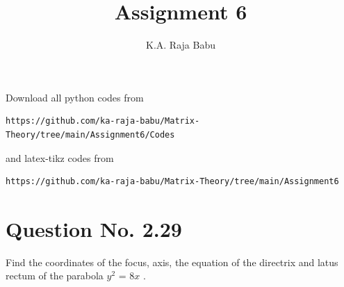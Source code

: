 \documentclass[journal,12pt,twocolumn]{IEEEtran}
\begin{document}
     \def\rightbox#1{\makebox[0in][r]{#1}}
     \def\centbox#1{\makebox[0in]{#1}}
     \def\topbox#1{\raisebox{-\baselineskip}[0in][0in]{#1}}
     \def\midbox#1{\raisebox{-0.5\baselineskip}[0in][0in]{#1}}
\vspace{3cm}
\title{Assignment 6}
\author{K.A. Raja Babu}
\maketitle
\newpage
\bigskip
\renewcommand{\thefigure}{\theenumi}
\renewcommand{\thetable}{\theenumi}
Download all python codes from 
\begin{lstlisting}
https://github.com/ka-raja-babu/Matrix-Theory/tree/main/Assignment6/Codes
\end{lstlisting}
%
and latex-tikz codes from 
%
\begin{lstlisting}
https://github.com/ka-raja-babu/Matrix-Theory/tree/main/Assignment6
\end{lstlisting}
%
\section{Question No. 2.29}
Find the coordinates of the focus, axis, the equation of the directrix and latus rectum of the parabola $y^2$ = 8$x$ .
%
\end{document}
